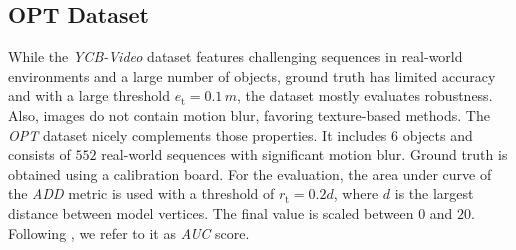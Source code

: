 \documentclass[10pt,twocolumn,letterpaper]{article}
\begin{document}
\subsection{OPT Dataset}\label{ssec:e1}
While the \textit{YCB-Video} dataset features challenging sequences in real-world environments and a large number of objects, ground truth has limited accuracy and with a large threshold $e_\textrm{t} = 0.1\,\unit{m}$, the dataset mostly evaluates robustness.
Also, images do not contain motion blur, favoring texture-based methods.
The \textit{OPT} dataset \cite{Wu2017} nicely complements those properties.
It includes $6$ objects and consists of $552$ real-world sequences with significant motion blur.
Ground truth is obtained using a calibration board.
For the evaluation, the area under curve of the \textit{ADD} metric is used with a threshold of $r_\textrm{t} = 0.2d$, where $d$ is the largest distance between model vertices.
The final value is scaled between $0$ and $20$.
Following \cite{Wu2017}, we refer to it as \textit{AUC} score.
\end{document}
